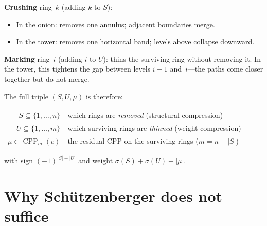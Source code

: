 \documentclass[11pt]{article}
\newcommand{\CPP}{\operatorname{CPP}}
\theoremstyle{plain}
\theoremstyle{definition}
\begin{document}
\begin{center}
\end{center}

\medskip\noindent
\textbf{Crushing} ring~$k$ (adding $k$ to $S$):
\begin{itemize}
  \item In the onion: removes one annulus; adjacent boundaries
    merge.
  \item In the tower: removes one horizontal band; levels above
    collapse downward.
\end{itemize}

\noindent
\textbf{Marking} ring~$i$ (adding $i$ to $U$): thins the
surviving ring without removing it.  In the tower, this
tightens the gap between levels $i{-}1$ and~$i$---the paths
come closer together but do not merge.

\medskip\noindent
The full triple $(S, U, \mu)$ is therefore:
\begin{center}
\renewcommand{\arraystretch}{1.3}
\begin{tabular}{r@{\;:\;}l}
$S \subseteq \{1, \ldots, n\}$
  & which rings are \emph{removed}
    (structural compression) \\
$U \subseteq \{1, \ldots, m\}$
  & which surviving rings are \emph{thinned}
    (weight compression) \\
$\mu \in \CPP_m(c)$
  & the residual CPP on the surviving rings
    ($m = n - |S|$)
\end{tabular}
\end{center}
with sign $(-1)^{|S|+|U|}$ and weight
$\sigma(S) + \sigma(U) + |\mu|$.


\section{Why Sch\"utzenberger does not suffice}
\end{document}
